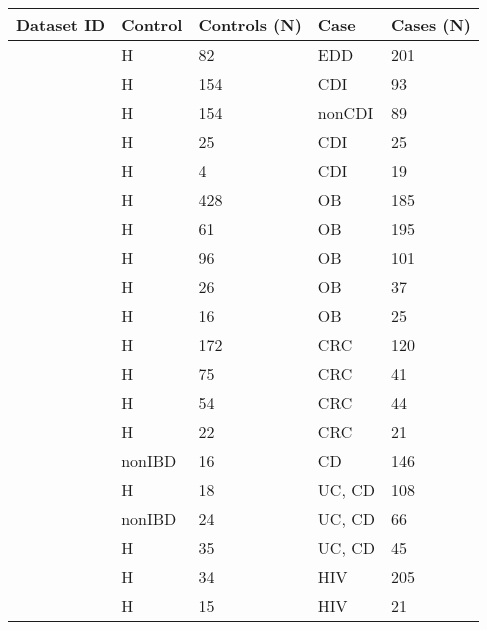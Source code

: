 \begin{table}[hbtp!]
	\centering
	\begin{tabular}{l l p{} l p{}}
	\toprule
	   Dataset ID & Control & Controls (N) & Case & Cases (N)\\
	   \midrule
		\cite{edd-singh} & \acrshort{H} & 82 & \acrshort{EDD} & 201 \\
		\cite{cdi-schubert} & \acrshort{H} & 154 & \acrshort{CDI} & 93 \\
		\cite{cdi-schubert} & \acrshort{H} & 154 & \acrshort{nonCDI} & 89 \\
		\cite{cdi-vincent} & \acrshort{H} & 25 & \acrshort{CDI} & 25 \\
		\cite{cdi-youngster} & \acrshort{H} & 4 & \acrshort{CDI} & 19 \\
		\cite{ob-goodrich} & \acrshort{H} & 428 & \acrshort{OB} & 185 \\
		\cite{ob-turnbaugh} & \acrshort{H} & 61 & \acrshort{OB} & 195 \\
		\cite{ob-zupancic} & \acrshort{H} & 96 & \acrshort{OB} & 101 \\
		\cite{ob-ross} & \acrshort{H} & 26 & \acrshort{OB} & 37 \\
		\cite{nash-zhu} & \acrshort{H} & 16 & \acrshort{OB} & 25 \\
		\cite{crc-baxter} & \acrshort{H} & 172 & \acrshort{CRC} & 120 \\
		\cite{crc-zeller} & \acrshort{H} & 75 & \acrshort{CRC} & 41 \\
		\cite{crc-zhaowang} & \acrshort{H} & 54 & \acrshort{CRC} & 44 \\
		\cite{crc-chen} & \acrshort{H} & 22 & \acrshort{CRC} & 21 \\
		\cite{ibd-gevers} & \acrshort{nonIBD} & 16 & \acrshort{CD} & 146 \\
		\cite{ibd-morgan} & \acrshort{H} & 18 & \acrshort{UC}, \acrshort{CD} & 108 \\
		\cite{ibd-papa} & \acrshort{nonIBD} & 24 & \acrshort{UC}, \acrshort{CD} & 66 \\
		\cite{ibd-willing} & \acrshort{H} & 35 & \acrshort{UC}, \acrshort{CD} & 45 \\
		\cite{noguera2016gut} & \acrshort{H} & 34 & \acrshort{HIV} & 205 \\
		\cite{hiv-dinh} & \acrshort{H} & 15 & \acrshort{HIV} & 21 \\

\end{tabular}
\end{table}
